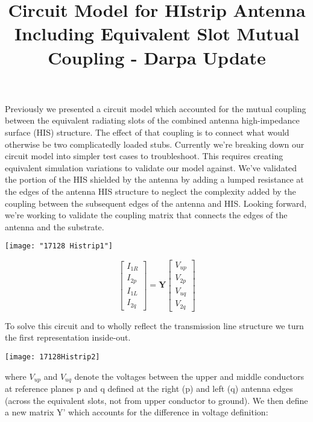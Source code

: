 \documentclass{article}
\title{Circuit Model for HIstrip Antenna Including Equivalent Slot Mutual Coupling - Darpa Update}
\begin{document}
\maketitle

Previously we presented a circuit model which accounted for the mutual coupling between the equivalent radiating slots of the combined antenna high-impedance surface (HIS) structure. The effect of that coupling is to connect what would otherwise be two complicatedly loaded stubs. Currently we're breaking down our circuit model into simpler test cases to troubleshoot. This requires creating equivalent simulation variations to validate our model against. We've validated the portion of the HIS shielded by the antenna by adding a lumped resistance at the edges of the antenna HIS structure to neglect the complexity added by the coupling between the subsequent edges of the antenna and HIS. Looking forward, we're working to validate the coupling matrix that connects the edges of the antenna and the substrate. 

\begin{center}
\centerline{\texttt{[image: "17128 Histrip1"]}}
\end{center}




\begin{equation}
	\begin{bmatrix}I_{1R} \\ I_{2p}\\I_{1L}\\I_{2q}\end{bmatrix} = \mathbf{Y} \begin{bmatrix}V_{up} \\ V_{2p}\\V_{uq}\\V_{2q}\end{bmatrix}
\end{equation}

To solve this circuit and to wholly reflect the transmission line structure we turn the first representation inside-out. 
\begin{center}
	\centerline{\texttt{[image: 17128Histrip2]}}
\end{center}


where $V_{up}$ and $V_{uq}$ denote the voltages between the upper and middle conductors at reference planes p and q defined at the right (p) and left (q) antenna edges (across the equivalent slots, not from upper conductor to ground). We then define a new matrix Y’ which accounts for the difference in voltage definition:
\end{document}
